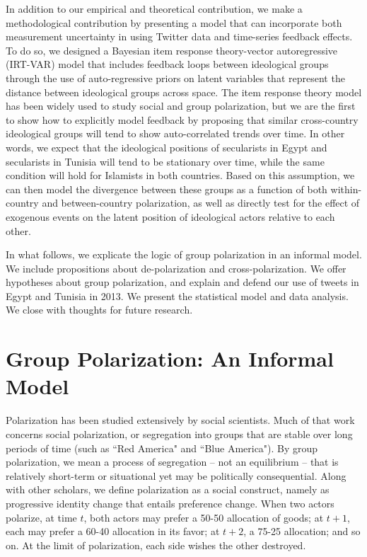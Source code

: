 \documentclass[12pt]{article}
\begin{document}
In addition to our empirical and theoretical contribution, we make a methodological contribution by presenting a model that can incorporate both measurement uncertainty in using Twitter data and time-series feedback effects. To do so, we designed a Bayesian item response theory-vector autoregressive (IRT-VAR) model that includes feedback loops between ideological groups through the use of auto-regressive priors on latent variables that represent the distance between ideological groups across space. The item response theory model has been widely used to study social and group polarization, but we are the first to show how to explicitly model feedback by proposing that similar cross-country ideological groups will tend to show auto-correlated trends over time. In other words, we expect that the ideological positions of secularists in Egypt and secularists in Tunisia will tend to be stationary over time, while the same condition will hold for Islamists in both countries. Based on this assumption, we can then model the divergence between these groups as a function of both within-country and between-country polarization, as well as directly test for the effect of exogenous events on the latent position of ideological actors relative to each other.

In what follows, we explicate the logic of group polarization in an informal model.  We include propositions about de-polarization and cross-polarization.  We offer hypotheses about group polarization, and explain and defend our use of tweets in Egypt and Tunisia in 2013.  We present the statistical model and data analysis.  We close with thoughts for future research.


\section*{Group Polarization: An Informal Model}
Polarization has been studied extensively by social scientists.  Much of that work concerns social polarization, or segregation into groups that are stable over long periods of time (such as ``Red America" and ``Blue America").   By group polarization, we mean a process of segregation – not an equilibrium – that is relatively short-term or situational yet may be politically consequential.   Along with other scholars, we define polarization as a social construct, namely as progressive identity change that entails preference change.   When two actors polarize, at time $t$, both actors may prefer a 50-50 allocation of goods; at $t+1$, each may prefer a 60-40 allocation in its favor; at $t+2$, a 75-25 allocation; and so on.  At the limit of polarization, each side wishes the other destroyed.   
\end{document}

